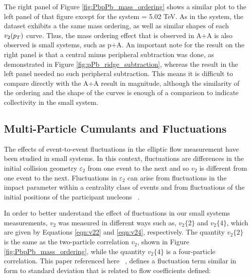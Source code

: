 The right panel of Figure \ref{fig:PbpPb_mass_ordering} shows a similar plot to the left panel of that figure except for the system \ppb \sqsn = 5.02 TeV. As in the \pbpb system, the \ppb dataset exhibits a the same mass ordering, as well as similar shapes of each $v_2(\mbox{$p_T$})$ curve. Thus, the mass ordering effect that is observed in A+A is also observed is small systems, such as p+A. An important note for the result on the right panel is that a central minus peripheral subtraction was done, as demonstrated in Figure \ref{fig:pPb_ridge_subtraction}, whereas the result in the left panel needed no such peripheral subtraction. This means it is difficult to compare directly with the A+A result in magnitude, although the similarity of the ordering and the shape of the curves is enough of a comparison to indicate collectivity in the small system.


\subsection{Multi-Particle Cumulants and Fluctuations}
\label{sec:cumulants_fluctua}
The effects of event-to-event fluctuations in the elliptic flow measurement have been studied in small systems. In this context, fluctuations are differences in the initial collision geometry $\varepsilon_2$ from one event to the next and so $v_2$ is different from one event to the next. Fluctuations in $\varepsilon_2$ can arise from fluctuations in the impact parameter within a centrality class of events and from fluctuations of the initial positions of the participant nucleons ~\cite{PhysRevC.80.014904}.

In order to better understand the effect of fluctuations in our small systems measurements, $v_2$ was measured in different ways such as, $v_2\{2\}$ and $v_2\{4\}$, which are given by Equations \ref{eqn:v22} and \ref{eqn:v24}, respectively. The quantity $v_2\{2\}$ is the same as the two-particle correlation $v_2$, shown in Figure \ref{fig:PbpPb_mass_ordering}, while the quantity $v_2\{4\}$ is a four-particle correlation. This paper referenced here ~\cite{PhysRevC.80.014904}, defines a fluctuation term similar in form to standard deviation that is related to flow coefficients defined:

